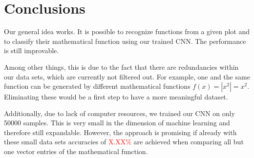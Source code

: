 \documentclass[11pt,a4paper]{scrartcl}
\begin{document}
	\section{Conclusions}
	Our general idea works. It is possible to recognize functions from a given plot and to classify their mathematical function using our trained CNN. The performance is still improvable.
	
	Among other things, this is due to the fact that there are redundancies within our data sets, which are currently not filtered out. For example, one and the same function can be generated by different mathematical functions \(f(x) = |x^2| = x^2\). Eliminating these would be a first step to have a more meaningful dataset.
	
	Additionally, due to lack of computer resources, we trained our CNN on only 50000 samples. This is very small in the dimension of machine learning and therefore still expandable. However, the approach is promising if already with these small data sets accuracies of \textcolor{red}{X.XX\%} are achieved when comparing all but one vector entries of the mathematical function. 
\end{document}
